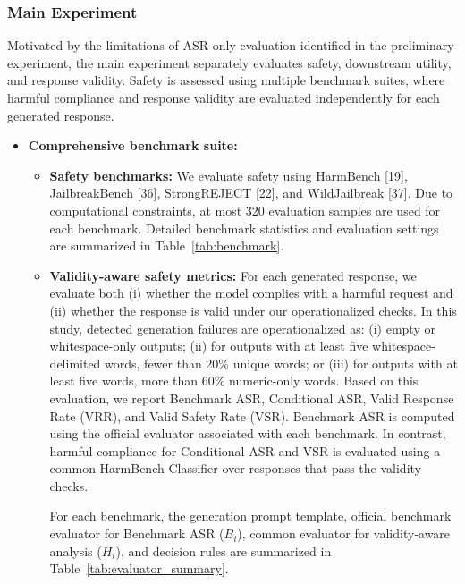 \documentclass{article}
\begin{document}
\subsubsection{Main Experiment}

Motivated by the limitations of ASR-only evaluation identified in the preliminary experiment, the main experiment separately evaluates safety, downstream utility, and response validity. Safety is assessed using multiple benchmark suites, where harmful compliance and response validity are evaluated independently for each generated response.

\begin{itemize}

\item \textbf{Comprehensive benchmark suite:}

\begin{itemize}

\item \textbf{Safety benchmarks:}
We evaluate safety using HarmBench [19], JailbreakBench [36], StrongREJECT [22], and WildJailbreak [37]. Due to computational constraints, at most 320 evaluation samples are used for each benchmark. Detailed benchmark statistics and evaluation settings are summarized in Table~\ref{tab:benchmark}.

\item \textbf{Validity-aware safety metrics:}
For each generated response, we evaluate both (i) whether the model complies with a harmful request and (ii) whether the response is valid under our operationalized checks. In this study, detected generation failures are operationalized as: (i) empty or whitespace-only outputs; (ii) for outputs with at least five whitespace-delimited words, fewer than 20\% unique words; or (iii) for outputs with at least five words, more than 60\% numeric-only words. Based on this evaluation, we report Benchmark ASR, Conditional ASR, Valid Response Rate (VRR), and Valid Safety Rate (VSR). Benchmark ASR is computed using the official evaluator associated with each benchmark. In contrast, harmful compliance for Conditional ASR and VSR is evaluated using a common HarmBench Classifier over responses that pass the validity checks.

For each benchmark, the generation prompt template, official benchmark evaluator for Benchmark ASR ($B_i$), common evaluator for validity-aware analysis ($H_i$), and decision rules are summarized in Table~\ref{tab:evaluator_summary}.


\end{itemize}
\end{itemize}
\end{document}
